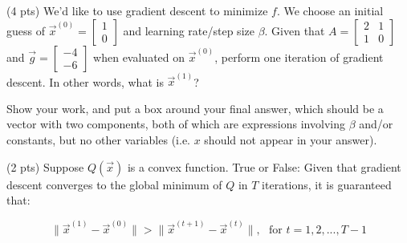 \documentclass[twoside,12pt]{article}
\begin{document}
\begin{probset}
\begin{prob}[(12 pts)]
\begin{subprobset}
\begin{subprob}(4 pts) We'd like to use gradient descent to minimize $f$. We choose an initial guess of $\vec x^{(0)} = \begin{bmatrix} 1 \\ 0 \end{bmatrix}$ and learning rate/step size $\beta$. Given that $A = \begin{bmatrix} 2 & 1 \\ 1 & 0 \end{bmatrix}$ and $\vec g = \begin{bmatrix} -4 \\ -6 \end{bmatrix}$ when evaluated on $\vec x^{(0)}$, perform one iteration of gradient descent. In other words, what is $\vec x^{(1)}$?

Show your work, and put a $\boxed{\text{box}}$ around your final answer, which should be a vector with two components, both of which are expressions involving $\beta$ and/or constants, but no other variables (i.e. $x$ should not appear in your answer).

\begin{responsebox}{2.5in}
    
\end{responsebox}
    
\end{subprob}

\begin{subprob}(2 pts) Suppose $Q(\vec x)$ is a convex function. True or False: Given that gradient descent converges to the global minimum of $Q$ in $T$ iterations, it is guaranteed that:

\vspace{-0.1in}

$$\lVert \vec x^{(1)} - \vec x^{(0)} \rVert > \lVert \vec x^{(t+1)} - \vec x^{(t)} \rVert, \:\:\: \text{for } t = 1, 2, ..., T-1$$



\end{subprob}
    
\end{subprobset}

\end{prob}

\newpage




\end{probset}
\end{document}
